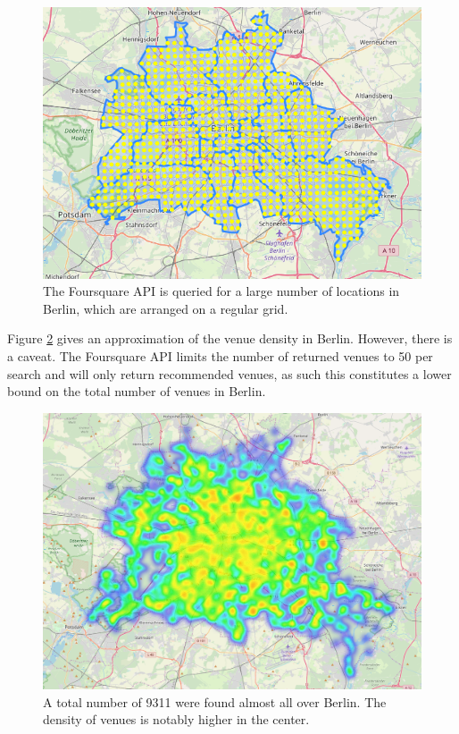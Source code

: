 \documentclass[letter]{scrartcl}
\begin{document}
\begin{figure}[h!]
\centering
\includegraphics[width=12cm]{../Figures/Grid.JPG}
\caption{The Foursquare API is queried for a large number of locations in Berlin, which are arranged on a regular grid.}\label{fig:Grid}
\end{figure}

Figure \ref{fig:HM} gives an approximation of the venue density in Berlin. However, there is a caveat. The Foursquare API limits the number of returned venues to 50 per search and will only return recommended venues, as such this constitutes a lower bound on the total number of venues in Berlin. 

\clearpage

\begin{figure}[h!]
\centering
\includegraphics[width=12cm]{../Figures/VenueHM.PNG}
\caption{A total number of 9311 were found almost all over Berlin. The density of venues is notably higher in the center. }\label{fig:HM}
\end{figure}
 
\end{document}
